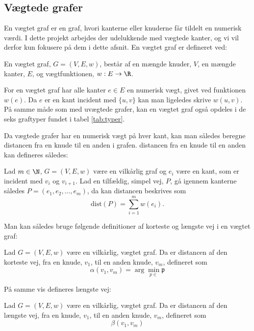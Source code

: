 \subsection{Vægtede grafer}
En vægtet graf er en graf, hvori kanterne eller knuderne får tildelt en numerisk værdi. I dette projekt arbejdes der udelukkende med vægtede kanter, og vi vil derfor kun fokusere på dem i dette afsnit.
En vægtet graf er defineret ved:
\begin{defn}
En vægtet graf, $G=(V,E,w)$, består af en mængde knuder, $V$, en mængde kanter, $E$, og vægtfunktionen, $w: E \rightarrow \R$.
\end{defn}

For en vægtet graf har alle kanter $e\in E$ en numerisk vægt, givet ved funktionen $w (e)$. Da $e$ er en kant incident med $\{u,v\}$ kan man ligeledes skrive $w (u,v)$. På samme måde som med uvægtede grafer, kan en vægtet graf også opdeles i de seks graftyper fundet i tabel \ref{tab:typer}.


Da vægtede grafer har en numerisk vægt på hver kant, kan man således beregne distancen fra en knude til en anden i grafen. distancen fra en knude til en anden kan defineres således:

\begin{defn}[Distance]
Lad $m\in \N $, $G=(V,E,w)$ være en vilkårlig graf og  $e_{i}$ være en kant, som er incident med $v_i$ og $v_{i+1}$. Lad en tilfældig, simpel vej, $P$, gå igennem kanterne således $P=(e_{1},e_{2},\dotsc,e_{m})$, da kan distancen beskrives som
	\begin{equation*}
	\mathrm{dist}(P)=\sum_{i=1}^{m}w(e_{i}).
	\end{equation*}  
\end{defn}

Man kan således bruge følgende definitioner af korteste og længste vej i en vægtet graf:


\begin{defn} \label{defn:min.vej}
Lad $G=(V,E,w)$ være en vilkårlig, vægtet graf. Da er distancen af den korteste vej, fra en knude, $v_1$, til en anden knude, $v_m$, defineret som
	\begin{equation*}
		\alpha(v_1,v_m)=\arg \min_{p\in} \mathfrak{p}
	\end{equation*}
\end{defn}

På samme vis defineres længste vej:

\begin{defn} 
Lad $G=(V,E,w)$ være en vilkårlig, vægtet graf. Da er distancen af den længste vej, fra en knude, $v_1$, til en anden knude, $v_m$, defineret som
	\begin{equation*}
		\beta(v_1,v_m)
	\end{equation*}
\end{defn}

